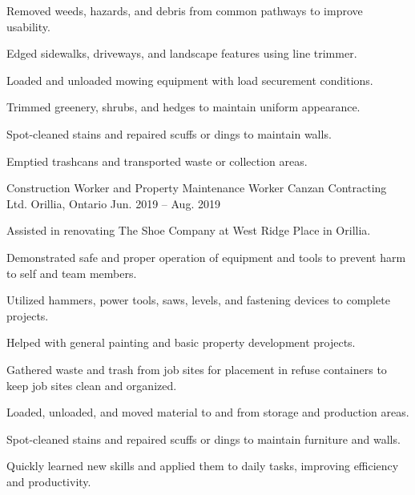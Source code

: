 \begin{cventries}
{\begin{cvitems}
        \item {Removed weeds, hazards, and debris from common pathways to improve usability.}
        \item{Edged sidewalks, driveways, and landscape features using line trimmer.}
        \item{Loaded and unloaded mowing equipment with load securement conditions.}
        \item{Trimmed greenery, shrubs, and hedges to maintain uniform appearance.}
        \item{Spot-cleaned stains and repaired scuffs or dings to maintain walls.}
        \item{Emptied trashcans and transported waste or collection areas.}
      \end{cvitems}
    }

  \cventry
    {Construction Worker and Property Maintenance Worker} %
    {Canzan Contracting Ltd.} %
    {Orillia, Ontario} %
    {Jun. 2019 -- Aug. 2019} %
    {
      \begin{cvitems} %
        \item {Assisted in renovating The Shoe Company at West Ridge Place in Orillia.}
        \item {Demonstrated safe and proper operation of equipment and tools to prevent harm to self and team members.}
        \item {Utilized hammers, power tools, saws, levels, and fastening devices to complete projects.}
        \item {Helped with general painting and basic property development projects.}
        \item {Gathered waste and trash from job sites for placement in refuse containers to keep job sites clean and organized.}
        \item {Loaded, unloaded, and moved material to and from storage and production areas.}
        \item {Spot-cleaned stains and repaired scuffs or dings to maintain furniture and walls.}
        \item {Quickly learned new skills and applied them to daily tasks, improving efficiency and productivity.}
      \end{cvitems}
    }
\end{cventries}
